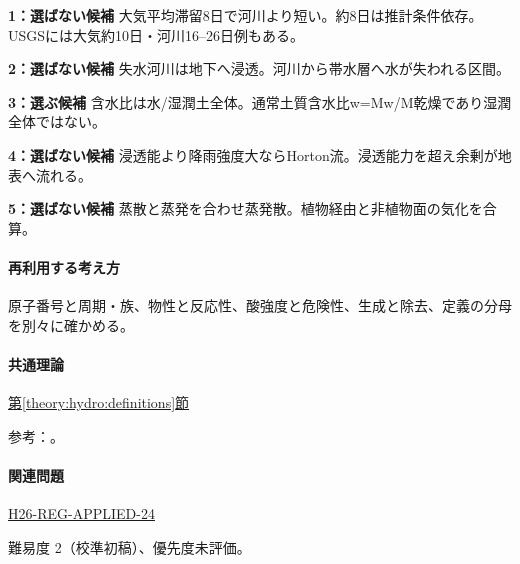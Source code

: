 \noindent\textbf{1：選ばない候補} 大気平均滞留8日で河川より短い。約8日は推計条件依存。USGSには大気約10日・河川16–26日例もある。\par

\noindent\textbf{2：選ばない候補} 失水河川は地下へ浸透。河川から帯水層へ水が失われる区間。\par

\noindent\textbf{3：選ぶ候補} 含水比は水/湿潤土全体。通常土質含水比w=\allowbreak{}Mw/M乾燥であり湿潤全体ではない。\par

\noindent\textbf{4：選ばない候補} 浸透能より降雨強度大ならHorton流。浸透能力を超え余剰が地表へ流れる。\par

\noindent\textbf{5：選ばない候補} 蒸散と蒸発を合わせ蒸発散。植物経由と非植物面の気化を合算。\par

\paragraph{再利用する考え方} 原子番号と周期・族、物性と反応性、酸強度と危険性、生成と除去、定義の分母を別々に確かめる。

\paragraph{共通理論} \hyperref[theory:hydro:definitions]{第\ref*{theory:hydro:definitions}節}

\par 参考：\cite{inorganic_hydro_ref,inorganic_waterbudget}。

\paragraph{関連問題} \hyperref[q:h26-reg-applied-24]{H26-REG-APPLIED-24}

\par 難易度 2（校準初稿）、優先度未評価。
